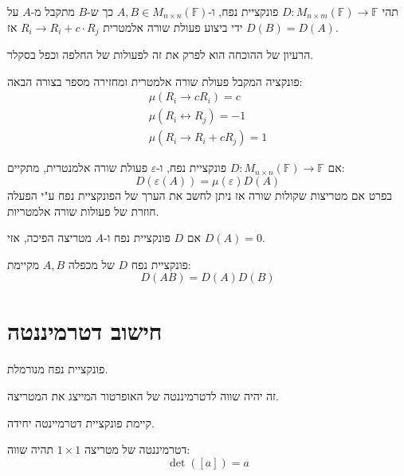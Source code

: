 \documentclass{tstextbook}
\begin{document}
\begin{proposition}
תהי \(D:M_{n\times m}\left( \mathbb{F}  \right)\to \mathbb{F}\) פונקציית נפח, ו-\(A,B \in M_{n\times n}\left( \mathbb{F}  \right)\) כך ש-\(B\) מתקבל מ-\(A\) על ידי ביצוע פעולת שורה אלמטרית \(R_{i}\to R_{i}+c\cdot R_{j}\) אז \(D(B)=D(A)\).

\end{proposition}
הרעיון של ההוכחה הוא לפרק את זה לפעולות של החלפה וכפל בסקלר.

\begin{definition}
פונקציה המקבל פעולת שורה אלמטרית ומחזירה מספר בצורה הבאה:
\begin{gather*}\mu\left( R_{i}\to cR_{i} \right)=c  \\\mu\left( R_{i}\leftrightarrow  R_{j}  \right) = -1 \\\mu\left( R_{i}\to R_{i}+cR_{j} \right)=1
\end{gather*}

\end{definition}
\begin{corollary}
אם \(D:M_{n\times n}\left( \mathbb{F}  \right)\to \mathbb{F}\) פונקציית נפח, ו-\(\varepsilon\) פעולת שורה אלמנטרית, מתקיים:
$$D\left( \varepsilon(A) \right)=\mu\left( \varepsilon \right)D(A)$$
בפרט אם מטריצות שקולות שורה אז ניתן לחשב את הערך של הפונקציית נפח ע"י הפעלה חוזרת של פעולות שורה אלמטריות.

\end{corollary}
\begin{proposition}
אם \(D\) פונקציית נפח ו-\(A\) מטריצה הפיכה, אזי \(D(A)=0\).

\end{proposition}
\begin{proposition}
פונקציית נפח \(D\) של מכפלה \(A,B\) מקיימת:
$$D(AB)=D(A) D (B)$$

\end{proposition}
\section{חישוב דטרמיננטה}

\begin{definition}[דטרמיננטה]
פונקציית נפח מנורמלת.

\end{definition}
\begin{definition}
זה יהיה שווה לדטרמיננטה של האופרטור המייצג את המטריצה.

\end{definition}
\begin{proposition}
קיימת פונקציית דטרמיינטה יחידה.

\end{proposition}
\begin{proposition}
דטרמיננטה של מטריצה \(1\times 1\) תהיה שווה:
$$\det([a])=a$$

\end{proposition}
\end{document}
